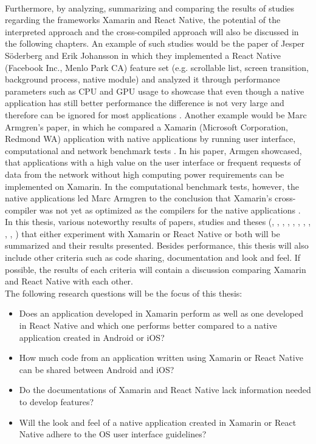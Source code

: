 \documentclass[Bachelor,BIF,english]{twbook}
\begin{document}
\\[\baselineskip]
Furthermore, by analyzing, summarizing and comparing the results of studies regarding the frameworks Xamarin and React Native, the potential of the interpreted approach and the cross-compiled approach will also be discussed in the following chapters. An example of such studies would be the paper of Jesper Söderberg and Erik Johansson in which they implemented a React Native (Facebook Inc., Menlo Park CA) feature set (e.g. scrollable list, screen transition, background process, native module) and analyzed it through performance parameters such as CPU and GPU usage to showcase that even though a native application has still better performance the difference is not very large and therefore can be ignored for most applications \cite{JohanssonSderberg2018}. Another example would be Marc Armgren’s paper, in which he compared a Xamarin (Microsoft Corporation, Redmond WA) application with native applications by running user interface, computational and network benchmark tests \cite{Armgren_2015}. In his paper, Armgen showcased, that applications with a high value on the user interface or frequent requests of data from the network without high computing power requirements can be implemented on Xamarin. In the computational benchmark tests, however, the native applications led Marc Armgren to the conclusion that Xamarin’s cross-compiler was not yet as optimized as the compilers for the native applications \cite{Armgren_2015}.
\\[\baselineskip]
In this thesis, various noteworthy results of papers, studies and theses (\cite{Danielsson_2016}, \cite{Hansson_Vidhall_2016}, \cite{MartinezLecomte2018}, \cite{ZubaBernhard2017EdPb}, \cite{WillocxVossaertNaessens2015}, \cite{MartinezLecomte2017}, \cite{Dickson_2013}, \cite{GaouarBenamarBendimerad2016}, \cite{7479278}, \cite{LinckArne2016}, \cite{7934674}) that either experiment with Xamarin or React Native or both will be summarized and their results presented. Besides performance, this thesis will also include other criteria such as code sharing, documentation and look and feel. If possible, the results of each criteria will contain a discussion comparing Xamarin and React Native with each other. 
\\[\baselineskip]
The following research questions will be the focus of this thesis:
\begin{itemize}
\item Does an application developed in Xamarin perform as well as one developed in React Native and which one performs better compared to a native application created in Android or iOS?
\item How much code from an application written using Xamarin or React Native can be shared between Android and iOS?
\item Do the documentations of Xamarin and React Native lack information needed to develop features?
\item Will the look and feel of a native application created in Xamarin or React Native adhere to the OS user interface guidelines?
\end{itemize}
\end{document}
